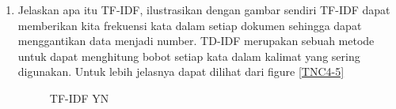 \begin{enumerate}
\item Jelaskan apa itu TF-IDF, ilustrasikan dengan gambar sendiri
TF-IDF dapat memberikan kita frekuensi kata dalam setiap dokumen sehingga dapat menggantikan data menjadi number. TD-IDF merupakan sebuah metode untuk dapat menghitung bobot setiap kata dalam kalimat yang sering digunakan. Untuk lebih jelasnya dapat dilihat dari figure \ref{TNC4-5}

	\begin{figure}[ht]
		\caption{TF-IDF YN}
		\label{YNC4-5}
	\end{figure}


\end{enumerate}

